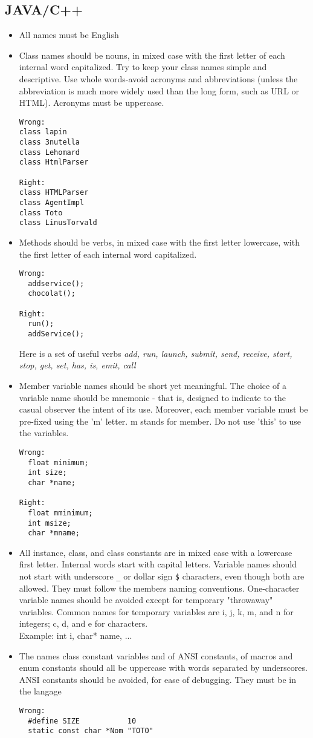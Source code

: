 \documentclass{article}
\begin{document}
\subsection{JAVA/C++}
\begin{itemize}
\item All names must be English
\item Class names should be nouns, in mixed case with the first letter of each
 internal word capitalized. Try to keep your class names simple and descriptive.
 Use whole words-avoid acronyms and abbreviations (unless the abbreviation is
 much more widely used than the long form, such as URL or HTML). Acronyms must
be uppercase.
\begin{verbatim}
Wrong:
class lapin
class 3nutella
class Lehomard
class HtmlParser

Right:
class HTMLParser
class AgentImpl
class Toto
class LinusTorvald
\end{verbatim}

\item Methods should be verbs, in mixed case with the first letter lowercase,
 with the first letter of each internal word capitalized.
\begin{verbatim}
Wrong:
  addservice();
  chocolat();

Right:
  run();
  addService();
\end{verbatim}
Here is a set of useful verbs \textit{add, run, launch, submit, send, receive,
start, stop, get, set, has, is, emit, call}
\item Member variable names should be short yet meaningful. The choice of a
 variable name should be mnemonic - that is, designed to indicate to the
 casual observer the intent of its use. Moreover, each member
 variable must be pre-fixed using the 'm' letter. m stands for member. 
 Do not use 'this' to use the variables.

\begin{verbatim}
Wrong:
  float minimum;
  int size;
  char *name;

Right:
  float mminimum;
  int msize;
  char *mname;
\end{verbatim}
\item All instance, class, and class constants are in mixed case with a
 lowercase first letter. Internal words start with capital letters. Variable
 names should not start with underscore \texttt{\_} or dollar sign \texttt{\$}
 characters, even though both are allowed. They must follow the members naming
 conventions.
One-character variable names should be avoided except for temporary "throwaway"
 variables. Common names for temporary variables are i, j, k, m, and n for
 integers; c, d, and e for characters.\\
  Example: int i, char* name, ...
\item The names class constant variables and of ANSI constants,
 of macros and enum constants should all be uppercase with words
 separated by underscores. ANSI constants should be avoided, for ease of
 debugging. They must be in the langage
\begin{verbatim}
Wrong:
  #define SIZE           10
  static const char *Nom "TOTO"


\end{verbatim}
\end{itemize}
\end{document}
